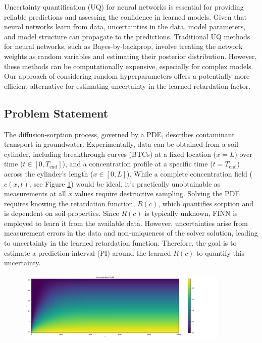 \documentclass{article}
\begin{document}
Uncertainty quantification (UQ) for neural networks is essential for providing reliable predictions and assessing the confidence in learned models. Given that neural networks learn from data, uncertainties in the data, model parameters, and model structure can propagate to the predictions.
Traditional UQ methods for neural networks, such as Bayes-by-backprop, involve treating the network weights as random variables and estimating their posterior distribution. However, these methods can be computationally expensive, especially for complex models. Our approach of considering random hyperparameters offers a potentially more efficient alternative for estimating uncertainty in the learned retardation factor.




\subsection{Problem Statement}
The diffusion-sorption process, governed by a PDE, describes contaminant transport in groundwater. Experimentally, data can be obtained from a soil cylinder, including breakthrough curves (BTCs) at a fixed location ($x=L$) over time ($t \in [0, T_{\text{end}}]$), and a concentration profile at a specific time ($t=T_{\text{end}}$) across the cylinder's length ($x \in [0,L]$). While a complete concentration field ($c(x,t)$, see Figure \ref{fig:c_diss_field_full}) would be ideal, it's practically unobtainable as measurements at all $x$ values require destructive sampling. Solving the PDE requires knowing the retardation function, $R(c)$, which quantifies sorption and is dependent on soil properties. Since $R(c)$ is typically unknown, FINN is employed to learn it from the available data. However, uncertainties arise from measurement errors in the data and non-uniqueness of the solver solution, leading to uncertainty in the learned retardation function. Therefore, the goal is to estimate a prediction interval (PI) around the learned $R(c)$ to quantify this uncertainty.

\begin{figure}
    \centering
    \includegraphics[width=0.9\textwidth]{figs/c_diss_field_full.png}
    \label{fig:c_diss_field_full}
\end{figure}
\end{document}

